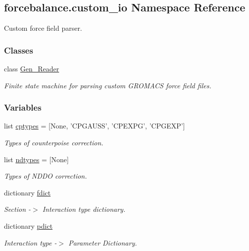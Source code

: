 \hypertarget{namespaceforcebalance_1_1custom__io}{\subsection{forcebalance.\-custom\-\_\-io Namespace Reference}
\label{namespaceforcebalance_1_1custom__io}
}


Custom force field parser.  


\subsubsection*{Classes}
\begin{DoxyCompactItemize}
\item 
class \hyperlink{classforcebalance_1_1custom__io_1_1Gen__Reader}{Gen\-\_\-\-Reader}
\begin{DoxyCompactList}\small\item\em Finite state machine for parsing custom G\-R\-O\-M\-A\-C\-S force field files. \end{DoxyCompactList}\end{DoxyCompactItemize}
\subsubsection*{Variables}
\begin{DoxyCompactItemize}
\item 
list \hyperlink{namespaceforcebalance_1_1custom__io_a74431bfa66994d256928c07d0ce7e863}{cptypes} = \mbox{[}None, 'C\-P\-G\-A\-U\-S\-S', 'C\-P\-E\-X\-P\-G', 'C\-P\-G\-E\-X\-P'\mbox{]}
\begin{DoxyCompactList}\small\item\em Types of counterpoise correction. \end{DoxyCompactList}\item 
list \hyperlink{namespaceforcebalance_1_1custom__io_a48080cd4a8bed35994bc5233d757c1d4}{ndtypes} = \mbox{[}None\mbox{]}
\begin{DoxyCompactList}\small\item\em Types of N\-D\-D\-O correction. \end{DoxyCompactList}\item 
dictionary \hyperlink{namespaceforcebalance_1_1custom__io_afc7a3a5f5b6f4b329abb6992eef3f7f3}{fdict}
\begin{DoxyCompactList}\small\item\em Section -\/$>$ Interaction type dictionary. \end{DoxyCompactList}\item 
dictionary \hyperlink{namespaceforcebalance_1_1custom__io_a74a4d05e55e54e30aa71b5ee293ca70d}{pdict}
\begin{DoxyCompactList}\small\item\em Interaction type -\/$>$ Parameter Dictionary. \end{DoxyCompactList}\end{DoxyCompactItemize}


